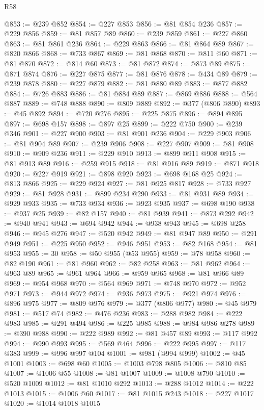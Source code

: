 \begin{lexlean}{R58}
\begin{coremodule}
@853 := @239 @852
@854 := @227 @853
@856 := @81 @854 @236
@857 := @229 @856
@859 := @81 @857 @89
@860 := @239 @859
@861 := @227 @860
@863 := @81 @861 @236
@864 := @229 @863
@866 := @81 @864 @89
@867 := @820 @866
@868 := @733 @867
@869 := @81 @868
@870 := @811 @60
@871 := @81 @870
@872 := @814 @60
@873 := @81 @872
@874 := @873 @89
@875 := @871 @874
@876 := @227 @875
@877 := @81 @876
@878 := @434 @89
@879 := @239 @878
@880 := @227 @879
@882 := @81 @880 @89
@883 := @877 @882
@884 := @726 @883
@886 := @81 @884 @89
@887 := @869 @886
@888 := @564 @887
@889 := @748 @888
@890 := @809 @889
@892 := @377 (@806 @890)
@893 := @45 @892
@894 := @720 @276
@895 := @225 @875
@896 := @894 @895
@897 := @698 @157
@898 := @897 @25
@899 := @222 @750
@900 := @239 @346
@901 := @227 @900
@903 := @81 @901 @236
@904 := @229 @903
@906 := @81 @904 @89
@907 := @239 @906
@908 := @227 @907
@909 := @81 @908
@910 := @909 @236
@911 := @229 @910
@913 := @899 @911 @908
@915 := @81 @913 @89
@916 := @259 @915
@918 := @81 @916 @89
@919 := @871 @918
@920 := @227 @919
@921 := @898 @920
@923 := @698 @168 @25
@924 := @813 @866
@925 := @229 @924
@927 := @81 @925 @817
@928 := @733 @927
@929 := @81 @928
@931 := @899 @234 @290
@933 := @81 @931 @89
@934 := @929 @933
@935 := @733 @934
@936 := @923 @935
@937 := @698 @190
@938 := @937 @25
@939 := @82 @157
@940 := @81 @939
@941 := @873 @292
@942 := @940 @941
@943 := @694 @942
@944 := @938 @943
@945 := @698 @258
@946 := @945 @276
@947 := @520 @942
@949 := @81 @947 @89
@950 := @291 @949
@951 := @225 @950
@952 := @946 @951
@953 := @82 @168
@954 := @81 @953
@955 := 30
@958 := @50 @955 (@53 @955)
@959 := @78 @958
@960 := @82 @190
@961 := @81 @960
@962 := @82 @258
@963 := @81 @962
@964 := @963 @89
@965 := @961 @964
@966 := @959 @965
@968 := @81 @966 @89
@969 := @954 @968
@970 := @564 @969
@971 := @748 @970
@972 := @952 @971
@973 := @944 @972
@974 := @936 @973
@975 := @921 @974
@976 := @896 @975
@977 := @809 @976
@979 := @377 (@806 @977)
@980 := @45 @979
@981 := @517 @74
@982 := @476 @236
@983 := @288 @982
@984 := @222 @983
@985 := @291 @494
@986 := @225 @985
@988 := @984 @986 @278
@989 := @390 @988
@990 := @222 @989
@992 := @81 @457 @89
@993 := @117 @992
@994 := @990 @993
@995 := @569 @464
@996 := @222 @995
@997 := @117 @383
@999 := @996 @997 @104
@1001 := @981 (@994 @999)
@1002 := @45 @1001
@1003 := @698 @60
@1005 := @1003 @798 @805
@1006 := @810 @85
@1007 := @1006 @55
@1008 := @81 @1007
@1009 := @1008 @790
@1010 := @520 @1009
@1012 := @81 @1010 @292
@1013 := @288 @1012
@1014 := @222 @1013
@1015 := @1006 @60
@1017 := @81 @1015 @243
@1018 := @227 @1017
@1020 := @1014 @1018 @1015

\end{coremodule}
\end{lexlean}
